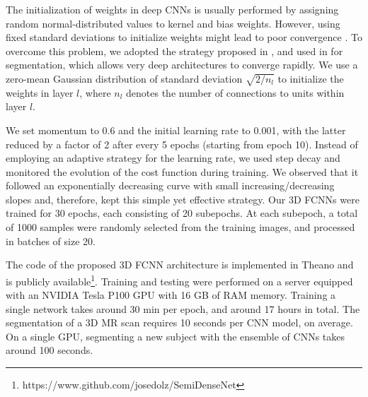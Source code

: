 \documentclass[twoside,espcrc2]{elsarticle}
\begin{document}
The initialization of weights in deep CNNs is usually performed by assigning random normal-distributed values to kernel and bias weights. However, using fixed standard deviations to initialize weights might lead to poor convergence \cite{simonyan2014very}. To overcome this problem, we adopted the strategy proposed in \cite{he2015delving}, and used in \cite{DolzNeuro2017,kamnitsas2017efficient} for segmentation, which allows very deep architectures to converge rapidly. We use a zero-mean Gaussian distribution of standard deviation $\sqrt{2/n_l}$ to initialize the weights in layer $l$, where $n_l$ denotes the number of connections to units within layer $l$. 
 
We set momentum to 0.6 and the initial learning rate to 0.001, with the latter reduced by a factor of 2 after every 5 epochs (starting from epoch 10). 
Instead of employing an adaptive strategy for the learning rate, we used step decay and monitored the evolution of the cost function during training. 
We observed that it followed an exponentially decreasing curve with small increasing/decreasing slopes and, therefore, kept this simple yet effective strategy. 
Our 3D FCNNs were trained for 30 epochs, each consisting of 20 subepochs. At each subepoch, a total of 1000 samples were randomly selected from the training images, and processed in batches of size 20.



The code of the proposed 3D FCNN architecture is implemented in Theano \cite{bergstra2010theano} and is publicly available\footnote{https://www.github.com/josedolz/SemiDenseNet}. Training and testing were performed on a server equipped with an NVIDIA Tesla P100 GPU with 16 GB of RAM memory. Training a single network takes around 30 min per epoch, and around 17 hours in total. The segmentation of a 3D MR scan requires 10 seconds per CNN model, on average. On a single GPU, segmenting a new subject with the ensemble of CNNs takes around 100 seconds.
\end{document}
